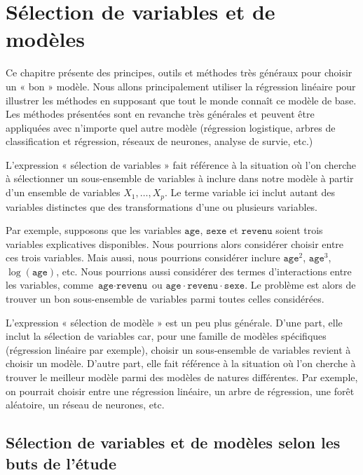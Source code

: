 \documentclass[
  11pt,
  letterpaper,
]{scrbook}
\theoremstyle{definition}
\theoremstyle{remark}
\begin{document}

\hypertarget{selection-modele}{%
\chapter{Sélection de variables et de modèles}\label{selection-modele}}

Ce chapitre présente des principes, outils et méthodes très généraux
pour choisir un « bon » modèle. Nous allons principalement utiliser la
régression linéaire pour illustrer les méthodes en supposant que tout le
monde connaît ce modèle de base. Les méthodes présentées sont en
revanche très générales et peuvent être appliquées avec n'importe quel
autre modèle (régression logistique, arbres de classification et
régression, réseaux de neurones, analyse de survie, etc.)

L'expression « sélection de variables » fait référence à la situation où
l'on cherche à sélectionner un sous-ensemble de variables à inclure dans
notre modèle à partir d'un ensemble de variables \(X_1, \ldots, X_p\).
Le terme variable ici inclut autant des variables distinctes que des
transformations d'une ou plusieurs variables.

Par exemple, supposons que les variables \(\texttt{age}\),
\(\texttt{sexe}\) et \(\texttt{revenu}\) soient trois variables
explicatives disponibles. Nous pourrions alors considérer choisir entre
ces trois variables. Mais aussi, nous pourrions considérer inclure
\(\texttt{age}^2\), \(\texttt{age}^3\), \(\log(\texttt{age})\), etc.
Nous pourrions aussi considérer des termes d'interactions entre les
variables, comme \(\texttt{age} \cdot \texttt{revenu}\) ou
\(\texttt{age}\cdot\texttt{revenu}\cdot\texttt{sexe}\). Le problème est
alors de trouver un bon sous-ensemble de variables parmi toutes celles
considérées.

L'expression « sélection de modèle » est un peu plus générale. D'une
part, elle inclut la sélection de variables car, pour une famille de
modèles spécifiques (régression linéaire par exemple), choisir un
sous-ensemble de variables revient à choisir un modèle. D'autre part,
elle fait référence à la situation où l'on cherche à trouver le meilleur
modèle parmi des modèles de natures différentes. Par exemple, on
pourrait choisir entre une régression linéaire, un arbre de régression,
une forêt aléatoire, un réseau de neurones, etc.

\hypertarget{suxe9lection-de-variables-et-de-moduxe8les-selon-les-buts-de-luxe9tude}{%
\section{Sélection de variables et de modèles selon les buts de
l'étude}\label{suxe9lection-de-variables-et-de-moduxe8les-selon-les-buts-de-luxe9tude}}
\end{document}
